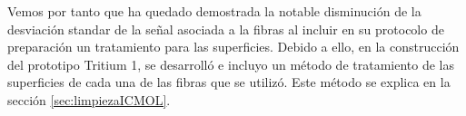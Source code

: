 Vemos por tanto que ha quedado demostrada la notable disminución de la desviación standar de la señal asociada a la fibras al incluir en su protocolo de preparación un tratamiento para las superficies. Debido a ello, en la construcción del prototipo Tritium 1, se desarrolló e incluyo un método de tratamiento de las superficies de cada una de las fibras que se utilizó. Este método se explica en la sección \ref{sec:limpiezaICMOL}.